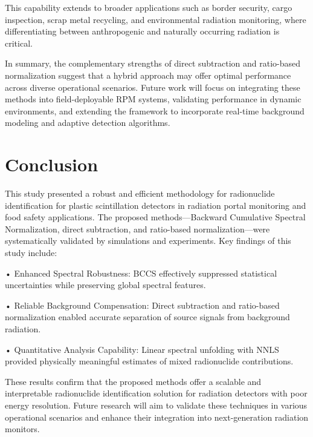 \documentclass[10pt]{wlscirep}
\begin{document}
This capability extends to broader applications such as border security, cargo inspection, scrap metal recycling, and environmental radiation monitoring, where differentiating between anthropogenic and naturally occurring radiation is critical.

In summary, the complementary strengths of direct subtraction and ratio-based normalization suggest that a hybrid approach may offer optimal performance across diverse operational scenarios. Future work will focus on integrating these methods into field-deployable RPM systems, validating performance in dynamic environments, and extending the framework to incorporate real-time background modeling and adaptive detection algorithms.

\section*{Conclusion}

This study presented a robust and efficient methodology for radionuclide identification for plastic scintillation detectors in radiation portal monitoring and food safety applications. The proposed methods—Backward Cumulative Spectral Normalization, direct subtraction, and ratio-based normalization—were systematically validated by simulations and experiments. Key findings of this study include:

• Enhanced Spectral Robustness: BCCS effectively suppressed statistical uncertainties while preserving global spectral features.

• Reliable Background Compensation: Direct subtraction and ratio-based normalization enabled accurate separation of source signals from background radiation.

• Quantitative Analysis Capability: Linear spectral unfolding with NNLS provided physically meaningful estimates of mixed radionuclide contributions.


These results confirm that the proposed methods offer a scalable and interpretable radionuclide identification solution for radiation detectors with poor energy resolution. Future research will aim to validate these techniques in various operational scenarios and enhance their integration into next-generation radiation monitors.


\end{document}
